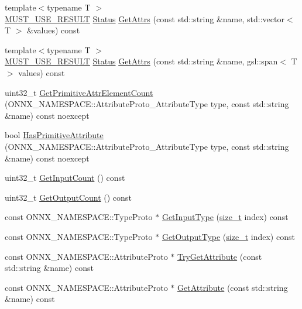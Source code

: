 \begin{DoxyCompactItemize}
\item 
{\footnotesize template$<$typename T $>$ }\\\mbox{\hyperlink{op__node__proto__helper_8h_afefbce768b9d0df9c9ebc30dd6d13fed}{M\+U\+S\+T\+\_\+\+U\+S\+E\+\_\+\+R\+E\+S\+U\+LT}} \mbox{\hyperlink{classonnxruntime_1_1common_1_1Status}{Status}} \mbox{\hyperlink{classonnxruntime_1_1OpNodeProtoHelper_a9eb3e20eb1e04d901b67bbb32f027161}{Get\+Attrs}} (const std\+::string \&name, std\+::vector$<$ T $>$ \&values) const
\item 
{\footnotesize template$<$typename T $>$ }\\\mbox{\hyperlink{op__node__proto__helper_8h_afefbce768b9d0df9c9ebc30dd6d13fed}{M\+U\+S\+T\+\_\+\+U\+S\+E\+\_\+\+R\+E\+S\+U\+LT}} \mbox{\hyperlink{classonnxruntime_1_1common_1_1Status}{Status}} \mbox{\hyperlink{classonnxruntime_1_1OpNodeProtoHelper_a8062b57424aadbfffcfe1095ce871765}{Get\+Attrs}} (const std\+::string \&name, gsl\+::span$<$ T $>$ values) const
\item 
uint32\+\_\+t \mbox{\hyperlink{classonnxruntime_1_1OpNodeProtoHelper_ad077f2ec1f980aec98a792cfbcca4dfb}{Get\+Primitive\+Attr\+Element\+Count}} (O\+N\+N\+X\+\_\+\+N\+A\+M\+E\+S\+P\+A\+C\+E\+::\+Attribute\+Proto\+\_\+\+Attribute\+Type type, const std\+::string \&name) const noexcept
\item 
bool \mbox{\hyperlink{classonnxruntime_1_1OpNodeProtoHelper_af4b6e9a3a48ac7edfe8beaecc765f8e4}{Has\+Primitive\+Attribute}} (O\+N\+N\+X\+\_\+\+N\+A\+M\+E\+S\+P\+A\+C\+E\+::\+Attribute\+Proto\+\_\+\+Attribute\+Type type, const std\+::string \&name) const noexcept
\item 
uint32\+\_\+t \mbox{\hyperlink{classonnxruntime_1_1OpNodeProtoHelper_a297703ea309efda9c6803fd49ce0cc6f}{Get\+Input\+Count}} () const
\item 
uint32\+\_\+t \mbox{\hyperlink{classonnxruntime_1_1OpNodeProtoHelper_ac3378cdeed5ea5ba03af197396816d00}{Get\+Output\+Count}} () const
\item 
const O\+N\+N\+X\+\_\+\+N\+A\+M\+E\+S\+P\+A\+C\+E\+::\+Type\+Proto $\ast$ \mbox{\hyperlink{classonnxruntime_1_1OpNodeProtoHelper_ab8738d1e3871fd8ab36e70a88444463f}{Get\+Input\+Type}} (\mbox{\hyperlink{mlasi_8h_a503efbc1c6e50825320ad909366b78ab}{size\+\_\+t}} index) const
\item 
const O\+N\+N\+X\+\_\+\+N\+A\+M\+E\+S\+P\+A\+C\+E\+::\+Type\+Proto $\ast$ \mbox{\hyperlink{classonnxruntime_1_1OpNodeProtoHelper_a6ca065e1d93d8ba0bc2bca41451cecbd}{Get\+Output\+Type}} (\mbox{\hyperlink{mlasi_8h_a503efbc1c6e50825320ad909366b78ab}{size\+\_\+t}} index) const
\item 
const O\+N\+N\+X\+\_\+\+N\+A\+M\+E\+S\+P\+A\+C\+E\+::\+Attribute\+Proto $\ast$ \mbox{\hyperlink{classonnxruntime_1_1OpNodeProtoHelper_a6163876dfd97f4e055cdd25bc2a3750c}{Try\+Get\+Attribute}} (const std\+::string \&name) const
\item 
const O\+N\+N\+X\+\_\+\+N\+A\+M\+E\+S\+P\+A\+C\+E\+::\+Attribute\+Proto $\ast$ \mbox{\hyperlink{classonnxruntime_1_1OpNodeProtoHelper_a1cf9304aa856c38063b20b13f6fcbeb6}{Get\+Attribute}} (const std\+::string \&name) const
\end{DoxyCompactItemize}


